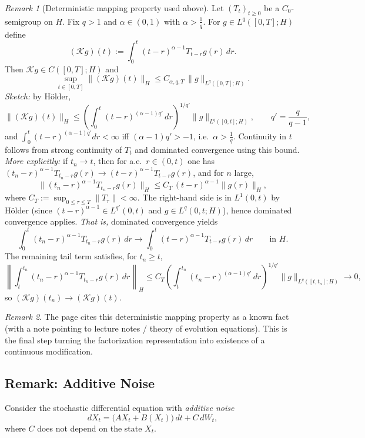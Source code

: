 \documentclass[11pt]{article}
\theoremstyle{definition}
\theoremstyle{remark}
\newtheorem{remark}{Remark}
\begin{document}
\begin{remark}[Deterministic mapping property used above]
Let $(T_t)_{t\ge 0}$ be a $C_0$-semigroup on $H$. Fix $q>1$ and $\alpha\in(0,1)$ with $\alpha>\frac{1}{q}$.
For $g\in L^{q}([0,T];H)$ define
\[
(\mathcal{K}g)(t):=\int_0^t (t-r)^{\alpha-1}T_{t-r}g(r)\,dr.
\]
Then $\mathcal{K}g\in C([0,T];H)$ and
\[
\sup_{t\in[0,T]}\|(\mathcal{K}g)(t)\|_H \le C_{\alpha,q,T}\,\|g\|_{L^{q}([0,T];H)}.
\]
\emph{Sketch:} by H\"older,
\[
\|(\mathcal{K}g)(t)\|_H
\le
\left(\int_0^t (t-r)^{(\alpha-1)q'}\,dr\right)^{1/q'}\|g\|_{L^{q}([0,t];H)},
\qquad q'=\frac{q}{q-1},
\]
and $\int_0^t (t-r)^{(\alpha-1)q'}dr<\infty$ iff $(\alpha-1)q'>-1$, i.e.\ $\alpha>\frac{1}{q}$. Continuity in $t$ follows from strong continuity of $T_t$ and dominated convergence using this bound.
\emph{More explicitly:} if $t_n\to t$, then for a.e.\ $r\in(0,t)$ one has $(t_n-r)^{\alpha-1}T_{t_n-r}g(r)\to (t-r)^{\alpha-1}T_{t-r}g(r)$, and for $n$ large,
\[
\|(t_n-r)^{\alpha-1}T_{t_n-r}g(r)\|_H \le C_T\,(t-r)^{\alpha-1}\|g(r)\|_H,
\]
where $C_T:=\sup_{0\le \tau\le T}\|T_\tau\|<\infty$. The right-hand side is in $L^1(0,t)$ by H\"older (since $(t-r)^{\alpha-1}\in L^{q'}(0,t)$ and $g\in L^q(0,t;H)$), hence dominated convergence applies.
\emph{That is,} dominated convergence yields
\[
\int_0^t (t_n-r)^{\alpha-1}T_{t_n-r}g(r)\,dr \longrightarrow \int_0^t (t-r)^{\alpha-1}T_{t-r}g(r)\,dr
\qquad\text{in }H.
\]
The remaining tail term satisfies, for $t_n\ge t$,
\[
\left\|\int_t^{t_n} (t_n-r)^{\alpha-1}T_{t_n-r}g(r)\,dr\right\|_H
\le
C_T\left(\int_t^{t_n} (t_n-r)^{(\alpha-1)q'}\,dr\right)^{1/q'}\|g\|_{L^q([t,t_n];H)}
\to 0,
\]
so $(\mathcal{K}g)(t_n)\to(\mathcal{K}g)(t)$.
\end{remark}

\begin{remark}
The page cites this deterministic mapping property as a known fact (with a note pointing to lecture notes / theory of evolution equations). This is the final step turning the factorization representation into existence of a continuous modification.
\end{remark}

\subsection*{Remark: Additive Noise}

Consider the stochastic differential equation with \emph{additive noise}
\[
dX_t = \bigl(AX_t + B(X_t)\bigr)\,dt + C\,dW_t,
\]
where $C$ does not depend on the state $X_t$.
\end{document}
